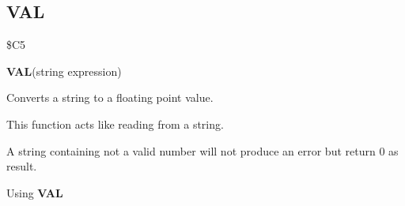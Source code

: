 
\newpage
\subsection{VAL}
\begin{description}[leftmargin=3cm,style=nextline]
\item [Token:] \$C5
\item [Format:] {\bf VAL}(string expression)
\item [Usage:] Converts a string to a floating point value.

               This function acts like reading from a string.

\item [Remarks:] A string containing not a valid number
                 will not produce an error but return 0 as result.

\item [Example:] Using {\bf VAL}
\end{description}


\newpage

